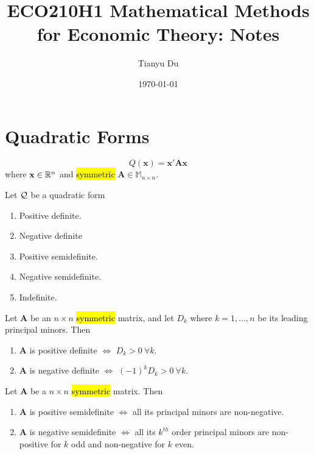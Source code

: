 \documentclass{article}
\title{ECO210H1 Mathematical Methods for Economic Theory: Notes}
\author{Tianyu Du}
\date{\today}
\begin{document}
	\maketitle
	\tableofcontents
	
	\section{Quadratic Forms}
		\begin{definition}
			\[
				Q(\textbf{x}) = \textbf{x}' \textbf{A} \textbf{x}
			\]
			where $\textbf{x} \in \mathbb{R}^n$ and \hl{symmetric} $\textbf{A} \in \mathbb{M}_{n\times n}$.
		\end{definition}
		
		\begin{definition}
			Let $\mathcal{{Q}}$ be a quadratic form
			\begin{enumerate}
				\item Positive definite.
				\item Negative definite
				\item Positive semidefinite.
				\item Negative semidefinite.
				\item Indefinite.
			\end{enumerate}
		\end{definition}
		
		\begin{definition}
			
		\end{definition}
		
		\begin{proposition}
			Let \textbf{A} be an $n\times n$ \hl{symmetric} matrix, and let $D_k$ where $k = 1,\dots, n$ be its leading principal minors. Then
			\begin{enumerate}
				\item \textbf{A} is positive definite $\iff$ $D_k > 0\ \forall k$. 
				\item \textbf{A} is negative definite $\iff$ $(-1)^k D_k > 0\ \forall k$.
			\end{enumerate}
		\end{proposition}
		
		\begin{definition}
			
		\end{definition}
		
		\begin{proposition}
			Let \textbf{A} be a $n \times n$ \hl{symmetric} matrix. Then
			\begin{enumerate}
				\item \textbf{A} is positive semidefinite $\iff$ all its principal minors are non-negative.
				\item \textbf{A} is negative semidefinite $\iff$ all its $k^{th}$ order principal minors are non-positive for $k$ odd and non-negative for $k$ even.
			\end{enumerate}
		\end{proposition}
	
\end{document}
